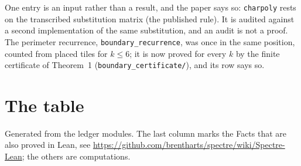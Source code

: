 \documentclass[10pt]{article}
\newcommand{\code}[1]{\texttt{#1}}
\begin{document}
One entry is an input rather than a result, and the paper says so:
\code{charpoly} rests on the transcribed substitution matrix (the published
rule).  It is audited against a second implementation of the same
substitution, and an audit is not a proof.  The perimeter recurrence,
\code{boundary\_recurrence}, was once in the same position, counted from
placed tiles for $k\le6$; it is now proved for every $k$ by the finite
certificate of Theorem~1 (\code{boundary\_certificate/}), and its row
says so.



\footnotesize
\section*{The table}
\label{app:facts}

Generated from the ledger modules.  The last column marks the Facts that
are also proved in Lean, see \url{https://github.com/brentharts/spectre/wiki/Spectre-Lean}; the others are computations.
\end{document}
